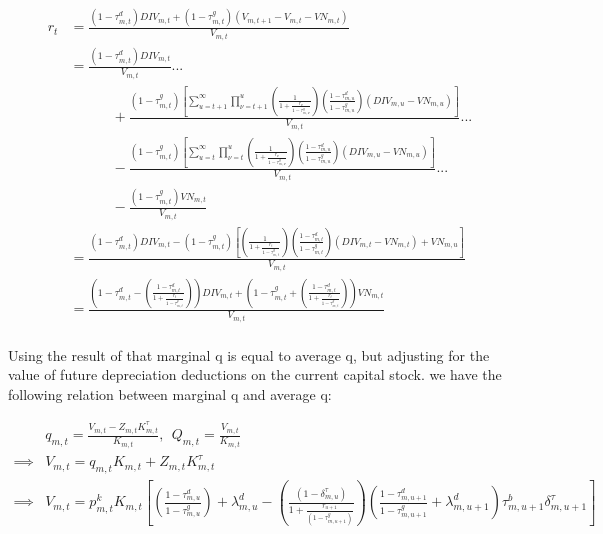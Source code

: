 \documentclass[letterpaper,12pt]{article}
\theoremstyle{definition}
\begin{document}
\begin{spacing}{1.5}
\begin{equation}
\begin{split}
r_{t} & = \frac{(1-\tau^{d}_{m,t})DIV_{m,t} + (1-\tau^{g}_{m,t})\left(V_{m,t+1}-V_{m,t}-VN_{m,t}\right)}{V_{m,t}}\\
& =  \frac{(1-\tau^{d}_{m,t})DIV_{m,t}}{V_{m,t}}... \\  
& \quad\quad\quad + \frac{(1-\tau^{g}_{m,t})\left[\sum_{u=t+1}^{\infty}\prod_{\nu=t+1}^{u}\left(\frac{1}{1+\frac{r_{\nu}}{1-\tau^{g}_{m,\nu}}}\right)\left(\frac{1-\tau^{d}_{m,u}}{1-\tau^{g}_{m,u}}\right)\left(DIV_{m,u}-VN_{m,u}\right)\right]}{V_{m,t}} ...\\
& \quad\quad\quad- \frac{(1-\tau^{g}_{m,t})\left[\sum_{u=t}^{\infty}\prod_{\nu=t}^{u}\left(\frac{1}{1+\frac{r_{\nu}}{1-\tau^{g}_{m,\nu}}}\right)\left(\frac{1-\tau^{d}_{m,u}}{1-\tau^{g}_{m,u}}\right)\left(DIV_{m,u}-VN_{m,u}\right)\right]}{V_{m,t}}... \\
& \quad\quad\quad - \frac{(1-\tau^{g}_{m,t})VN_{m,t}}{V_{m,t}} \\
& = \frac{(1-\tau^{d}_{m,t})DIV_{m,t} - (1-\tau^{g}_{m,t})\left[\left(\frac{1}{1+\frac{r_{t}}{1-\tau^{g}_{m,t}}}\right)\left(\frac{1-\tau^{d}_{m,t}}{1-\tau^{g}_{m,t}}\right)\left(DIV_{m,t}-VN_{m,t}\right)+VN_{m,u}\right]}{V_{m,t}} \\
& = \frac{\left(1-\tau^{d}_{m,t}-\left(\frac{1-\tau^{d}_{m,t}}{1+\frac{r_{t}}{1-\tau^{g}_{m,t}}}\right)\right)DIV_{m,t} + \left(1-\tau^{g}_{m,t}+\left(\frac{1-\tau^{d}_{m,t}}{1+\frac{r_{t}}{1-\tau^{g}_{m,t}}}\right)\right)VN_{m,t}}{V_{m,t}}  \\
\end{split}
\end{equation}


Using the result of \citet{Hayashi1982} that marginal q is equal to average q, but adjusting for the value of future depreciation deductions on the current capital stock. we have the following relation between marginal q and average q:

\begin{equation}
\begin{split}
&q_{m,t} = \frac{V_{m,t}-Z_{m,t}K^{\tau}_{m,t}}{K_{m,t}}, \ \  Q_{m,t}= \frac{V_{m,t}}{K_{m,t}}  \\
\implies & V_{m,t}=q_{m,t}K_{m,t} + Z_{m,t}K^{\tau}_{m,t}  \\
\implies & V_{m,t}=p^{k}_{m,t}K_{m,t}\left[\left(\frac{1-\tau^{d}_{m,u}}{1-\tau^{g}_{m,u}}\right) + \lambda^{d}_{m,u} -  \left(\frac{(1-\delta^{\tau}_{m,u})}{1+\frac{r_{u+1}}{(1-\tau^{g}_{m,u+1})}}\right)  \left(\frac{1-\tau^{d}_{m,u+1}}{1-\tau^{g}_{m,u+1}}+\lambda^{d}_{m,u+1}\right)\tau^{b}_{m,u+1}\delta^{\tau}_{m,u+1} \right]  \\
\end{split}
\end{equation}


\end{spacing}
\end{document}
